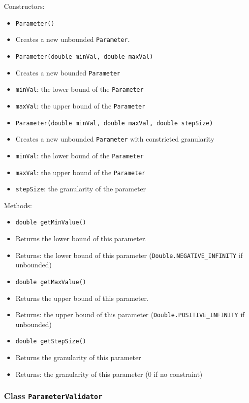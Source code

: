 \documentclass[parskip=full,11pt]{scrartcl}
\begin{document}
Constructors:
\begin{itemize}\itemsep -10pt
	\item \texttt{Parameter()}
	\item[] Creates a new unbounded \texttt{Parameter}.

	\item \texttt{Parameter(double minVal, double maxVal)}
	\item[] Creates a new bounded \texttt{Parameter}
	\item[] \texttt{minVal}: the lower bound of the \texttt{Parameter}
	\item[] \texttt{maxVal}: the upper bound of the \texttt{Parameter}
	\item \texttt{Parameter(double minVal, double maxVal, double stepSize)}
	\item[] Creates a new unbounded \texttt{Parameter} with constricted granularity
\item[] \texttt{minVal}: the lower bound of the \texttt{Parameter}
	\item[] \texttt{maxVal}: the upper bound of the \texttt{Parameter}
	\item[] \texttt{stepSize}: the granularity of the parameter

\end{itemize}

Methods:

\begin{itemize}\itemsep -10pt
	\item \texttt{double getMinValue()}
	\item[] Returns the lower bound of this parameter.
	\item[] Returns: the lower bound of this parameter (\texttt{Double.NEGATIVE\_INFINITY} if unbounded)
	\item \texttt{double getMaxValue()}
	\item[] Returns the upper bound of this parameter.
	\item[] Returns: the upper bound of this parameter (\texttt{Double.POSITIVE\_INFINITY} if unbounded)
	\item \texttt{double getStepSize()}
	\item[] Returns the granularity of this parameter
	\item[]Returns: the granularity of this parameter (\(0\) if no constraint)
\end{itemize}

\subsubsection{Class \texttt{ParameterValidator}}
\end{document}

